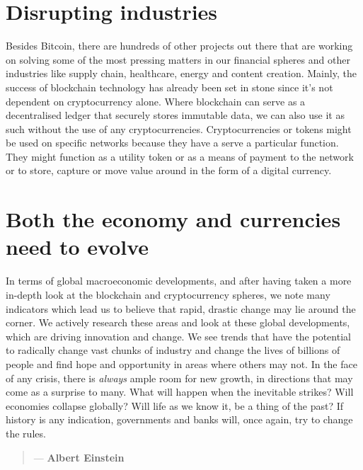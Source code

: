 \section*{Disrupting industries}
Besides Bitcoin, there are hundreds of other projects out there that are working on solving some of the most pressing matters in our financial spheres and other industries like supply chain, healthcare, energy and content creation. Mainly, the success of blockchain technology has already been set in stone since it's not dependent on cryptocurrency alone. Where blockchain can serve as a decentralised ledger that securely stores immutable data, we can also use it as such without the use of any cryptocurrencies. Cryptocurrencies or tokens might be used on specific networks because they have a serve a particular function. They might function as a utility token or as a means of payment to the network or to store, capture or move value around in the form of a digital currency.\medskip

\section*{Both the economy and currencies need to evolve}

In terms of global macroeconomic developments, and after having taken a more in-depth look at the blockchain and cryptocurrency spheres, we note many indicators which lead us to believe that rapid, drastic change may lie around the corner. We actively research these areas and look at these global developments, which are driving innovation and change. We see trends that have the potential to radically change vast chunks of industry and change the lives of billions of people and find hope and opportunity in areas where others may not. In the face of any crisis, there is \emph{always} ample room for new growth, in directions that may come as a surprise to many. What will happen when the inevitable strikes? Will economies collapse globally? Will life as we know it, be a thing of the past? If history is any indication, governments and banks will, once again, try to change the rules. 

    \begin{quotation}
        \textit{}
            \begin{flushright}
                \small{--- \textbf{Albert Einstein}}
            \end{flushright}
    \end{quotation}

